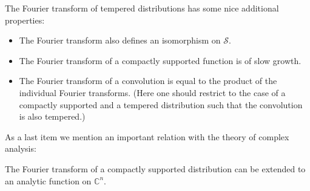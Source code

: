     \begin{property}
        The Fourier transform of tempered distributions has some nice additional properties:
        \begin{itemize}
            \item The Fourier transform also defines an isomorphism on $\mathscr{S}$.
            \item The Fourier transform of a compactly supported function is of slow growth.
            \item The Fourier transform of a convolution is equal to the product of the individual Fourier transforms. (Here one should restrict to the case of a compactly supported and a tempered distribution such that the convolution is also tempered.)
        \end{itemize}
    \end{property}
    As a last item we mention an important relation with the theory of complex analysis:
    \begin{theorem}
        The Fourier transform of a compactly supported distribution can be extended to an analytic function on $\mathbb{C}^n$.
    \end{theorem}